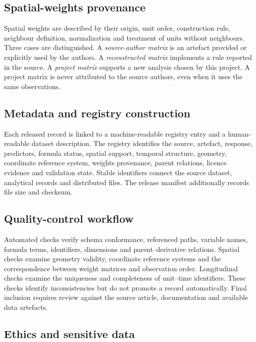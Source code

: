 \documentclass[10pt,a4paper]{article}
\begin{document}
\subsection*{Spatial-weights provenance}

Spatial weights are described by their origin, unit order, construction rule,
neighbour definition, normalization and treatment of units without neighbours.
Three cases are distinguished. A \emph{source-author matrix} is an artefact
provided or explicitly used by the authors. A \emph{reconstructed matrix}
implements a rule reported in the source. A \emph{project matrix} supports a
new analysis chosen by this project. A project matrix is never attributed to
the source authors, even when it uses the same observations.

\subsection*{Metadata and registry construction}

Each released record is linked to a machine-readable registry entry and a
human-readable dataset description. The registry identifies the source,
artefact, response, predictors, formula status, spatial support, temporal
structure, geometry, coordinate reference system, weights provenance, parent
relations, licence evidence and validation state. Stable identifiers connect
the source dataset, analytical records and distributed files. The release
manifest additionally records file size and checksum.

\subsection*{Quality-control workflow}

Automated checks verify schema conformance, referenced paths, variable names,
formula terms, identifiers, dimensions and parent--derivative relations.
Spatial checks examine geometry validity, coordinate reference systems and the
correspondence between weight matrices and observation order. Longitudinal
checks examine the uniqueness and completeness of unit--time identifiers.
These checks identify inconsistencies but do not promote a record
automatically. Final inclusion requires review against the source article,
documentation and available data artefacts.

\subsection*{Ethics and sensitive data}
\end{document}
